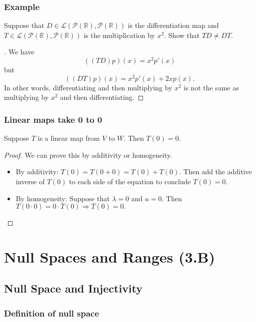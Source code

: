 \documentclass[11pt]{article}
\begin{document}
    \subsubsection{Example}

    Suppose that \(D \in \mathcal{L}(\mathcal{P}(\mathbb{R}), \mathcal{P}(\mathbb{R}))\) is the differentiation map and \(T \in \mathcal{L}(\mathcal{P}(\mathbb{R}), \mathcal{P}(\mathbb{R}))\) is the multiplication by \(x^2\). Show that \(TD \neq DT\). 

    \begin{proof}[\unskip\nopunct]
        We have \[((TD)p)(x) = x^2 p'(x)\] but \[((DT)p)(x) = x^2 p'(x) + 2x p(x).\] In other words, differentiating and then multiplying by \(x^2\) is not the same as multiplying by \(x^2\) and then differentiating. 
    \end{proof}

    \subsubsection{Linear maps take 0 to 0}

    Suppose $T$ is a linear map from $V$ to $W$. Then \(T(0) = 0\).

    \begin{proof}
        We can prove this by additivity or homogeneity.
        \begin{itemize}
            \item By additivity: \(T(0) = T(0+0) = T(0) + T(0)\). Then add the additive inverse of \(T(0)\) to each side of the equation to conclude \(T(0) = 0\).
            \item By homogeneity: Suppose that \(\lambda = 0\) and \(u = 0\). Then \(T(0 \cdot 0) = 0 \cdot T(0) \Rightarrow T(0) = 0.\)
        \end{itemize}
    \end{proof}

    \pagebreak

    \section{Null Spaces and Ranges (3.B)}

    \subsection{Null Space and Injectivity}

    \subsubsection{Definition of null space}
\end{document}
